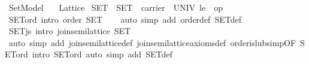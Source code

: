 %
\begin{isabellebody}%
\def\isabellecontext{Set{\isaliteral{5F}{\isacharunderscore}}Model}%
%
\isadelimtheory
%
\endisadelimtheory
%
\isatagtheory
{}\isamarkupfalse%
\ Set{}Model\isanewline
\ \ \ Lattice\isanewline
{}%
\endisatagtheory
{\isafoldtheory}%
%
\isadelimtheory
\isanewline
%
\endisadelimtheory
\isanewline
{}\isamarkupfalse%
\ SET\ \ {}SET\ {}\ {}carrier\ {}\ UNIV{}\ le\ {}\ op\ {}{}{}\isanewline
\isanewline
{}\isamarkupfalse%
\ SET{}ord\ {}intro{}{}\ {}order\ SET{}\isanewline
%
\isadelimproof
\ \ %
\endisadelimproof
%
\isatagproof
{}\isamarkupfalse%
\ {}auto\ simp\ add{}\ order{}def\ SET{}def{}%
\endisatagproof
{\isafoldproof}%
%
\isadelimproof
\isanewline
%
\endisadelimproof
\isanewline
{}\isamarkupfalse%
\ SET{}js\ {}intro{}{}\ {}join{}semilattice\ SET{}\isanewline
%
\isadelimproof
\ \ %
\endisadelimproof
%
\isatagproof
{}\isamarkupfalse%
\ {}auto\ simp\ add{}\ join{}semilattice{}def\ join{}semilattice{}axioms{}def\ order{}is{}lub{}simp{}OF\ SET{}ord{}\ intro{}\ SET{}ord{}\ {}auto\ simp\ add{}\ SET{}def{}%

\end{isabellebody}
